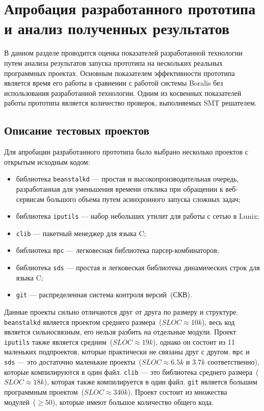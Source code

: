 \chapter{Апробация разработанного прототипа и анализ полученных результатов}
\label{chapter:testing}
В данном разделе проводится оценка показателей разработанной технологии путем 
анализа результатов запуска прототипа на несколь­ких реальных программных 
проектах. Основным показателем эффективности прототипа является время его работы
в сравнении с работой системы Boralis без использования разработанной технологии.
Одним из косвенных показателей работы прототипа является количество проверок,
выполняемых SMT решателем.

\section{Описание тестовых проектов}
Для апробации разработанного прототипа было выбрано несколько проектов с открытым
исходным кодом:
\begin{itemize}
\item библиотека \texttt{beanstalkd} --- простая и высокопроизводительная 
оче­редь, разработанная для уменьшения времени отклика при об­ращении к веб-
сервисам большого объема путем асинхронного запуска сложных задач;
\item библиотека \texttt{iputils} --- набор небольших утилит для работы с
се­тью в Lunix;
\item \texttt{clib} --- пакетный менеджер для языка C;
\item библиотека \texttt{mpc} --- легковесная библиотека парсер-комбинаторов;
\item библиотека \texttt{sds} --- простая и легковеская библиотека динамических
строк для языка C;
\item \texttt{git} — распределенная система контроля версий~(СКВ).
\end{itemize}

Данные проекты сильно отличаются друг от друга по размеру и структуре. 
\texttt{beanstalkd} является проектом среднего размера~($SLOC \approx 10k$), 
весь код является сильносвязным, его нельзя разбить на отдельные модули. Проект 
\texttt{iputils} также явля­ется средним~($SLOC \approx 19k$), однако он состоит 
из 11 маленьких подпроектов, которые практически не связаны друг с другом. 
\texttt{mpc} и \texttt{sds} --- это достаточно маленькие проекты~($SLOC \approx 
6.5k$ и $3.7k$ соответственно), которые компилируются в один файл. \texttt{clib}
--- это библиотека среднего размера~($SLOC \approx 18k$), которая также 
компилируется в один файл. \texttt{git} является большим программным
проектом~($SLOC \approx 340k$). Проект состоит из множества модулей~($\ge 50$), 
которые имеют большое количество общего кода.

